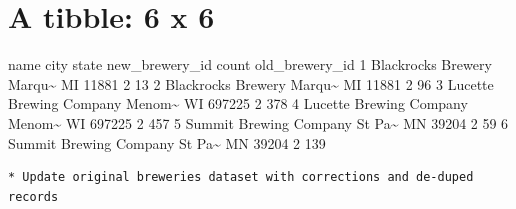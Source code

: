\documentclass[]{article}
\newenvironment{Shaded}{\begin{snugshade}}{\end{snugshade}}
\newcommand{\KeywordTok}[1]{\textcolor[rgb]{0.13,0.29,0.53}{\textbf{#1}}}
\newcommand{\DataTypeTok}[1]{\textcolor[rgb]{0.13,0.29,0.53}{#1}}
\newcommand{\StringTok}[1]{\textcolor[rgb]{0.31,0.60,0.02}{#1}}
\newcommand{\CommentTok}[1]{\textcolor[rgb]{0.56,0.35,0.01}{\textit{#1}}}
\newcommand{\OperatorTok}[1]{\textcolor[rgb]{0.81,0.36,0.00}{\textbf{#1}}}
\newcommand{\NormalTok}[1]{#1}
\begin{document}
\begin{Shaded}
\end{Shaded}

\section{A tibble: 6 x 6}\label{a-tibble-6-x-6}

name city state new\_brewery\_id count old\_brewery\_id 1 Blackrocks
Brewery Marqu\textasciitilde{} MI 11881 2 13 2 Blackrocks Brewery
Marqu\textasciitilde{} MI 11881 2 96 3 Lucette Brewing Company
Menom\textasciitilde{} WI 697225 2 378 4 Lucette Brewing Company
Menom\textasciitilde{} WI 697225 2 457 5 Summit Brewing Company St
Pa\textasciitilde{} MN 39204 2 59 6 Summit Brewing Company St
Pa\textasciitilde{} MN 39204 2 139

\begin{verbatim}
* Update original breweries dataset with corrections and de-duped records
\end{verbatim}
\end{document}
